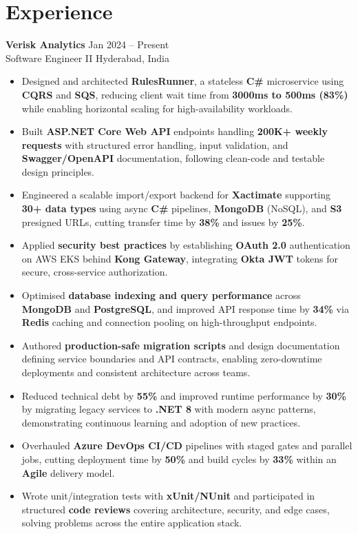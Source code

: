 \documentclass[10pt,letterpaper]{article}
\newcommand{\resumeSubheading}[4]{%
  \textbf{#1} \hfill #2 \\
  #3 \hfill #4 \\
}
\begin{document}
\section*{Experience}
\resumeSubheading{Verisk Analytics}{Jan 2024 -- Present}{Software Engineer II}{Hyderabad, India}
\begin{itemize}
    \item Designed and architected \textbf{RulesRunner}, a stateless \textbf{C\#} microservice using \textbf{CQRS} and \textbf{SQS}, reducing client wait time from \textbf{3000ms to 500ms (83\%)} while enabling horizontal scaling for high-availability workloads.
    \item Built \textbf{ASP.NET Core Web API} endpoints handling \textbf{200K+ weekly requests} with structured error handling, input validation, and \textbf{Swagger/OpenAPI} documentation, following clean-code and testable design principles.
    \item Engineered a scalable import/export backend for \textbf{Xactimate} supporting \textbf{30+ data types} using async \textbf{C\#} pipelines, \textbf{MongoDB} (NoSQL), and \textbf{S3} presigned URLs, cutting transfer time by \textbf{38\%} and issues by \textbf{25\%}.
    \item Applied \textbf{security best practices} by establishing \textbf{OAuth 2.0} authentication on AWS EKS behind \textbf{Kong Gateway}, integrating \textbf{Okta JWT} tokens for secure, cross-service authorization.
    \item Optimised \textbf{database indexing and query performance} across \textbf{MongoDB} and \textbf{PostgreSQL}, and improved API response time by \textbf{34\%} via \textbf{Redis} caching and connection pooling on high-throughput endpoints.
    \item Authored \textbf{production-safe migration scripts} and design documentation defining service boundaries and API contracts, enabling zero-downtime deployments and consistent architecture across teams.
    \item Reduced technical debt by \textbf{55\%} and improved runtime performance by \textbf{30\%} by migrating legacy services to \textbf{.NET 8} with modern async patterns, demonstrating continuous learning and adoption of new practices.
    \item Overhauled \textbf{Azure DevOps CI/CD} pipelines with staged gates and parallel jobs, cutting deployment time by \textbf{50\%} and build cycles by \textbf{33\%} within an \textbf{Agile} delivery model.
    \item Wrote unit/integration tests with \textbf{xUnit/NUnit} and participated in structured \textbf{code reviews} covering architecture, security, and edge cases, solving problems across the entire application stack.
\end{itemize}
\end{document}
